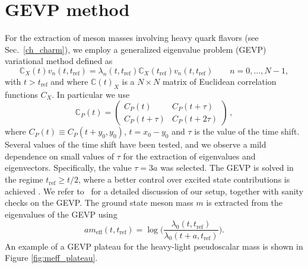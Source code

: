 \chapter{GEVP method}
\label{apex_GEVP}

For the extraction of meson masses involving heavy quark flavors (see Sec.~\ref{ch_charm}), we employ a generalized eigenvalue problem (GEVP) variational method defined as 
\begin{equation}\label{eq:gevp_sec3}
 	\mathit{\mathbb{C}}_X(t) v_n(t,t_{\mathrm{ref}}) = \lambda_n(t,t_{\mathrm{ref}}) \mathit{\mathbb{C}}_X(t_{\mathrm{ref}})v_n(t,t_{\mathrm{ref}}) \qquad n=0,\ldots,N-1 ,
\end{equation}
with $t>t_{\mathrm{ref}}$ and where $\mathit{\mathbb{C}}(t)_X$ is a $N\times N$ matrix of Euclidean correlation functions $C_X$. In particular we use
\begin{equation}
 	\mathit{\mathbb{C}}_{P}(t) = \left(\begin{matrix}
 		C_{P}(t)  &  C_{P}(t+\tau)
 		\\
 		C_{P}(t+\tau)  & C_{P}(t+2\tau)
 	\end{matrix}\right) \,,
\label{eq:gevp_matrix}
\end{equation}
where $C_P(t)\equiv C_P(t+y_0,y_0)$, $t=x_0-y_0$ and $\tau$ is the value of the time shift. Several values of the time shift have been tested, and we observe a mild dependence on small values of $\tau$ for the extraction of eigenvalues and eigenvectors. Specifically, the value $\tau=3a$ was selected. The GEVP  is solved in the regime  $t_{\mathrm{ref}} \geq t/2$, where a better control over excited state contributions is achieved \cite{Blossier:2009kd}. We refer to~\citep{charm} for a detailed discussion of our setup, together with sanity checks on the GEVP. The ground state meson mass $m$ is extracted from the eigenvalues of the GEVP using 
\begin{equation}\label{eq:eff_en_gevp}
	am_{\mathrm{eff}}(t,t_{\mathrm{ref}})=\log\bigg(\frac{\lambda_0(t,t_{\mathrm{ref}})}{\lambda_0(t+a,t_{\mathrm{ref}})}\bigg).
\end{equation}
An example of a GEVP plateau for the heavy-light pseudoscalar mass is shown in Figure \ref{fig:meff_plateau}. 
 
